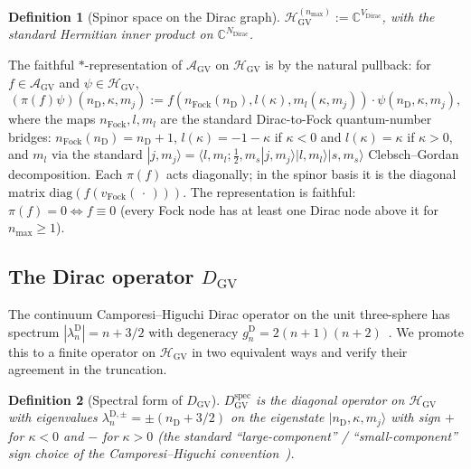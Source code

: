 \documentclass[11pt]{article}
\newtheorem{definition}{Definition}
\begin{document}
\begin{definition}[Spinor space on the Dirac graph]
\label{def:H_GV}
$\mathcal{H}_{\mathrm{GV}}^{(n_{\max})} := \mathbb{C}^{V_{\mathrm{Dirac}}}$,
with the standard Hermitian inner product on $\mathbb{C}^{N_{\mathrm{Dirac}}}$.
\end{definition}

The faithful $*$-representation of $\mathcal{A}_{\mathrm{GV}}$ on
$\mathcal{H}_{\mathrm{GV}}$ is by the natural pullback: for
$f \in \mathcal{A}_{\mathrm{GV}}$ and $\psi \in \mathcal{H}_{\mathrm{GV}}$,
\begin{equation}
   (\pi(f) \psi)(n_{\mathrm{D}}, \kappa, m_j)
   := f(n_{\mathrm{Fock}}(n_{\mathrm{D}}), l(\kappa), m_l(\kappa, m_j))
   \cdot \psi(n_{\mathrm{D}}, \kappa, m_j),
   \label{eq:representation}
\end{equation}
where the maps $n_{\mathrm{Fock}}, l, m_l$ are the standard Dirac-to-Fock
quantum-number bridges:
$n_{\mathrm{Fock}}(n_{\mathrm{D}}) = n_{\mathrm{D}} + 1$,
$l(\kappa) = -1 - \kappa$ if $\kappa < 0$ and $l(\kappa) = \kappa$ if
$\kappa > 0$, and $m_l$ via the standard
$|j, m_j\rangle = \langle l, m_l; \tfrac{1}{2}, m_s | j, m_j \rangle
|l, m_l\rangle |s, m_s\rangle$ Clebsch--Gordan decomposition.
Each $\pi(f)$ acts diagonally; in the spinor basis it is the diagonal
matrix $\mathrm{diag}(f(v_{\mathrm{Fock}}(\,\cdot\,)))$.  The
representation is faithful: $\pi(f) = 0 \Leftrightarrow f \equiv 0$
(every Fock node has at least one Dirac node above it for $n_{\max}
\ge 1$).

\subsection{The Dirac operator $D_{\mathrm{GV}}$}

The continuum Camporesi--Higuchi Dirac operator on the unit
three-sphere has spectrum $|\lambda_n^{\mathrm{D}}| = n + 3/2$ with
degeneracy $g_n^{\mathrm{D}} = 2(n+1)(n+2)$~\cite{camporesi_higuchi1996}.
We promote this to a finite operator on $\mathcal{H}_{\mathrm{GV}}$
in two equivalent ways and verify their agreement in the truncation.

\begin{definition}[Spectral form of $D_{\mathrm{GV}}$]
\label{def:D_GV_spectral}
$D_{\mathrm{GV}}^{\mathrm{spec}}$ is the diagonal operator on
$\mathcal{H}_{\mathrm{GV}}$ with eigenvalues
$\lambda_n^{\mathrm{D},\pm} = \pm (n_{\mathrm{D}} + 3/2)$
on the eigenstate $|n_{\mathrm{D}}, \kappa, m_j\rangle$ with sign
$+$ for $\kappa < 0$ and $-$ for $\kappa > 0$ (the standard
``large-component'' / ``small-component'' sign choice of the
Camporesi--Higuchi convention~\cite{camporesi_higuchi1996}).
\end{definition}
\end{document}
